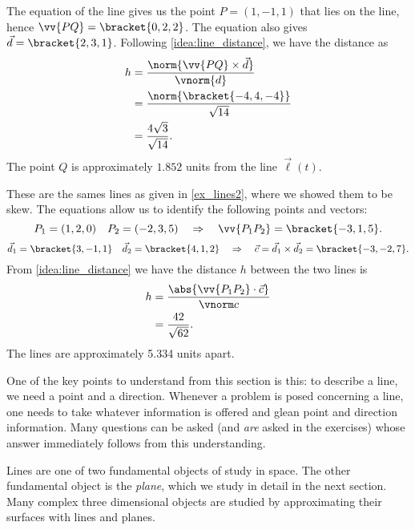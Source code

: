 {The equation of the line gives us the point $P=(1,-1,1)$ that lies on the line, hence $\vv{PQ} =\bracket{0,2,2}$. The equation also gives $\vec d=\bracket{2,3,1}$. Following \autoref{idea:line_distance}, we have the distance as 
\begin{align*}
h &= \frac{\norm{\vv{PQ}\times \vec d}}{\vnorm{d}}\\
	&= \frac{\norm{\bracket{-4,4,-4}}}{\sqrt{14}}\\
	&=\frac{4\sqrt{3}}{\sqrt{14}} %
	.
\end{align*}
The point $Q$ is approximately $1.852$ units from the line $\vec\ell(t)$.}

{These are the sames lines as given in \autoref{ex_lines2}, where we showed them to be skew. The equations allow us to identify the following points and vectors:
\[P_1 = (1,2,0)\quad P_2 = (-2,3,5) \quad \Rightarrow \quad \vv{P_1P_2} =\bracket{-3,1,5}.\]
\[\vec d_1 =\bracket{3,-1,1}\quad \vec d_2 =\bracket{4,1,2}\quad \Rightarrow \quad \vec c = \vec d_1\times \vec d_2 =\bracket{-3,-2,7}.\]
From \autoref{idea:line_distance} we have the distance $h$ between the two lines is
\begin{align*}
h &= \frac{\abs{\vv{P_1P_2}\cdot \vec c}}{\vnorm c}\\
&=\frac{42}{\sqrt{62}} %
.
\end{align*}
The lines are approximately 5.334 units apart.}

One of the key points to understand from this section is this: to describe a line, we need a point and a direction. Whenever a problem is posed concerning a line, one  needs to take whatever information is offered and glean point and direction information. Many questions can be asked (and \emph{are} asked in the exercises) whose answer immediately follows from this understanding. 

Lines are one of two fundamental objects of study in space. The other fundamental object is the \emph{plane}, which we study in detail in the next section. Many complex three dimensional objects are studied by approximating their surfaces with lines and planes.

